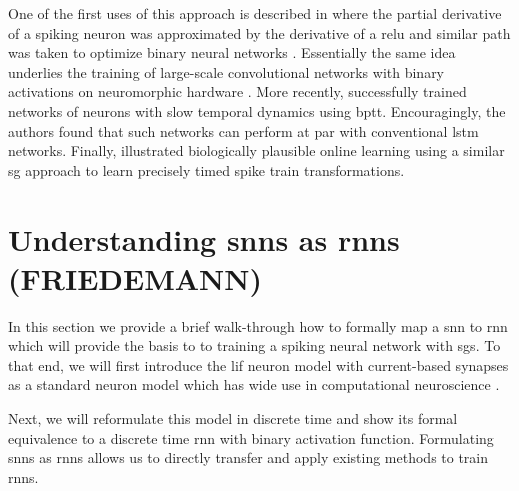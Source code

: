 \documentclass[journal,onecolumn,11pt]{IEEEtran}
\begin{document}
One of the first uses of this approach is described in
\citet{bohte_error-backpropagation_2011} where the partial derivative of a
spiking neuron was approximated by the derivative of a \gls{relu}
and similar path was taken to optimize binary neural networks
\citep{courbariaux_binarized_2016}.
Essentially the same idea underlies the training of large-scale
convolutional networks with binary activations on neuromorphic hardware
\cite{esser_convolutional_2016}.
More recently, \cite{bellec_long_2018} successfully trained networks of 
neurons with slow temporal dynamics using \gls{bptt}. Encouragingly, the 
authors found that such networks can perform at par with conventional 
\gls{lstm} networks.
Finally, \cite{zenke_superspike:_2018} illustrated biologically plausible online
learning using a similar \gls{sg} approach to learn precisely timed spike train
transformations. 

\cite{OConnor_Welling16_deepspik} %









\section{Understanding \glspl{snn} as \glspl{rnn} (FRIEDEMANN)}
\label{sec:understanding_ssn_as_rnn}

In this section we provide a brief walk-through how to formally map a \gls{snn} to \gls{rnn} 
which will provide the basis to to training a spiking neural network with \glspl{sg}.
To that end, we will first introduce the \gls{lif} neuron model
with current-based synapses as 
a standard neuron model which has wide use in computational neuroscience \cite{Gerstner_etal14_neurdyna}.

Next, we will reformulate this model in discrete time and show its formal equivalence to a discrete time \gls{rnn} with binary activation function. 
Formulating \glspl{snn} as \glspl{rnn} 
allows us to directly transfer and apply existing methods to train \glspl{rnn}. 
\end{document}

